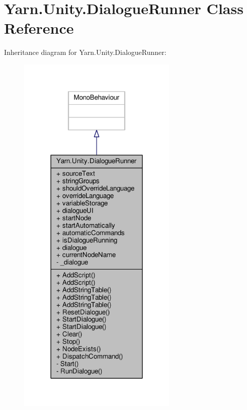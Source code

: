 \hypertarget{a00073}{\section{Yarn.\-Unity.\-Dialogue\-Runner Class Reference}
\label{a00073}
}


Inheritance diagram for Yarn.\-Unity.\-Dialogue\-Runner\-:
\nopagebreak
\begin{figure}[H]
\begin{center}
\leavevmode
\includegraphics[width=216pt]{da/d3a/a00694}
\end{center}
\end{figure}


